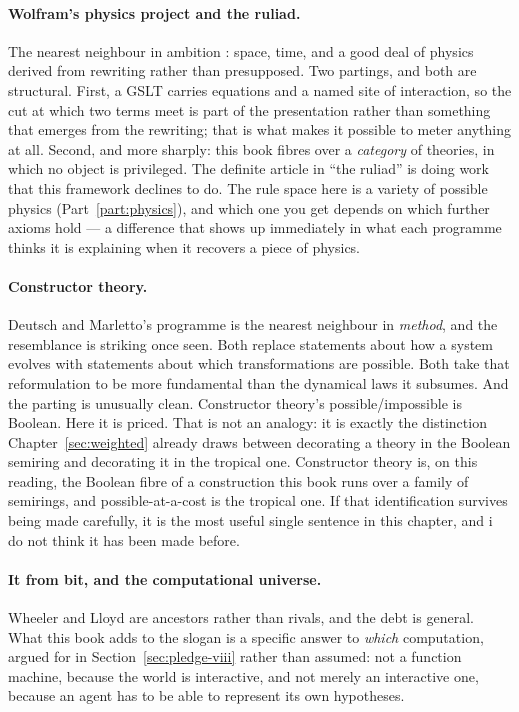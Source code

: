 \paragraph{Wolfram's physics project and the ruliad.}
The nearest neighbour in ambition \cite{wolfram2020,wolfram2021}:
space, time, and a good deal of physics derived from rewriting
rather than presupposed.
Two partings, and both are structural.
First, a GSLT carries equations and a named site of interaction, so
the cut at which two terms meet is part of the presentation rather
than something that emerges from the rewriting; that is what makes
it possible to meter anything at all.
Second, and more sharply: this book fibres over a \emph{category}
of theories, in which no object is privileged.
The definite article in ``the ruliad'' is doing work that this
framework declines to do.
The rule space here is a variety of possible physics
(Part~\ref{part:physics}), and which one you get depends on which
further axioms hold --- a difference that shows up immediately in
what each programme thinks it is explaining when it recovers a
piece of physics.

\paragraph{Constructor theory.}
Deutsch and Marletto's programme \cite{deutsch2013,marletto2015}
is the nearest neighbour in \emph{method}, and the resemblance is
striking once seen.
Both replace statements about how a system evolves with statements
about which transformations are possible.
Both take that reformulation to be more fundamental than the
dynamical laws it subsumes.
And the parting is unusually clean.
Constructor theory's possible/impossible is Boolean.
Here it is priced.
That is not an analogy: it is exactly the distinction
Chapter~\ref{sec:weighted} already draws between decorating a
theory in the Boolean semiring and decorating it in the tropical
one.
Constructor theory is, on this reading, the Boolean fibre of a
construction this book runs over a family of semirings, and
possible-at-a-cost is the tropical one.
If that identification survives being made carefully, it is the
most useful single sentence in this chapter, and i do not think it
has been made before.

\paragraph{It from bit, and the computational universe.}
Wheeler \cite{wheeler1990} and Lloyd \cite{lloyd2006} are
ancestors rather than rivals, and the debt is general.
What this book adds to the slogan is a specific answer to
\emph{which} computation, argued for in
Section~\ref{sec:pledge-viii} rather than assumed: not a function
machine, because the world is interactive, and not merely an
interactive one, because an agent has to be able to represent its
own hypotheses.

